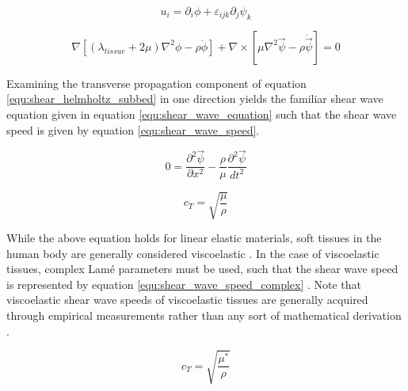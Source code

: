 			\begin{equation}
				\label{equ:shear_helmholtz_decomp}
				u_i = \partial_i \phi + \varepsilon_{ijk}\partial_j\psi_k
			\end{equation}

			\begin{equation}
				\label{equ:shear_helmholtz_subbed}
				\nabla\left[\left(\lambda_{tissue} + 2\mu\right) \nabla^2 \phi - \rho \ddot{\phi}\right] + \nabla \times \left[\mu \nabla^2 \vec{\psi} - \rho\ddot{\vec{\psi}}\right] = 0
			\end{equation}

			Examining the transverse propagation component of equation \ref{equ:shear_helmholtz_subbed} in one direction yields the familiar shear wave equation given in equation \ref{equ:shear_wave_equation} such that the shear wave speed is given by equation \ref{equ:shear_wave_speed}.

			\begin{equation}
				\label{equ:shear_wave_equation}
				0 = \frac{\partial^2 \vec{\psi}}{\partial x^2} - \frac{\rho}{\mu}\frac{\partial^2 \vec{\psi}}{dt^2}
			\end{equation}

			\begin{equation}
				\label{equ:shear_wave_speed}
				c_T = \sqrt{\frac{\mu}{\rho}}
			\end{equation}

			While the above equation holds for linear elastic materials, soft tissues in the human body are generally considered viscoelastic \cite{gras13,wang13}. In the case of viscoelastic tissues, complex Lam\'{e} parameters must be used, such that the shear wave speed is represented by equation \ref{equ:shear_wave_speed_complex} \cite{amador12}. Note that viscoelastic shear wave speeds of viscoelastic tissues are generally acquired through empirical measurements rather than any sort of mathematical derivation \cite{then07,madsen83}.

			\begin{equation}
				\label{equ:shear_wave_speed_complex}
				c_T = \sqrt{\frac{\mu^*}{\rho}}
			\end{equation}

